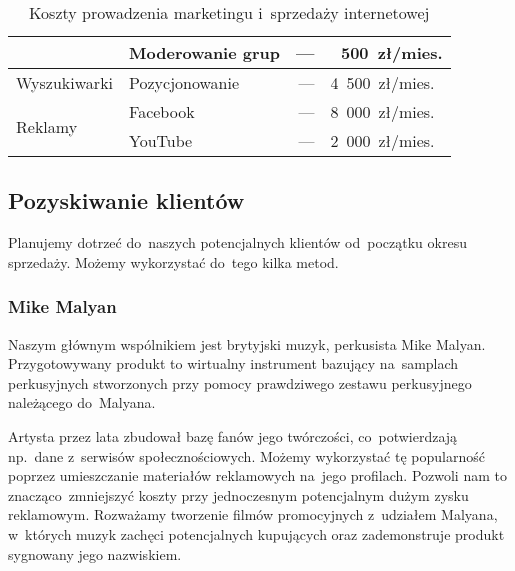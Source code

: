 \documentclass[12pt]{article}
\begin{document}
\begin{table}[h!]
\begin{center}
{\begin{tabular}{llrr}
     & Moderowanie grup   & ---    & 500~zł/mies.   \\
 \midrule
     \multirow{1}{*}{Wyszukiwarki}
     & Pozycjonowanie & --- & 4~500~zł/mies.~\cite{pozycjonowanie} \\
 \midrule
     \multirow{2}{*}{Reklamy}
     & Facebook   & --- & 8~000~zł/mies.~\cite{facebook} \\
     & YouTube    & --- & 2~000~zł/mies.~\cite{youtube}  \\
 \bottomrule
 \end{tabular}}
 \caption{Koszty prowadzenia marketingu i~sprzedaży internetowej}
 \label{table:marketing-sprzedaz}
 \end{center}
\end{table}

\subsection{Pozyskiwanie klientów}


Planujemy dotrzeć do~naszych potencjalnych klientów od~początku okresu sprzedaży.
Możemy wykorzystać do~tego kilka metod.

\subsubsection{Mike Malyan}


Naszym głównym wspólnikiem jest brytyjski muzyk, perkusista Mike Malyan.
Przygotowywany produkt to wirtualny instrument bazujący na~samplach perkusyjnych stworzonych przy pomocy prawdziwego zestawu perkusyjnego należącego do~Malyana.

Artysta przez lata zbudował bazę fanów jego twórczości, co~potwierdzają np.~dane z~serwisów społecznościowych.
Możemy wykorzystać tę popularność poprzez umieszczanie materiałów reklamowych na~jego profilach.
Pozwoli nam to znacząco~zmniejszyć koszty przy jednoczesnym potencjalnym dużym zysku reklamowym.
Rozważamy tworzenie filmów promocyjnych z~udziałem Malyana, w~których muzyk zachęci potencjalnych kupujących oraz zademonstruje produkt sygnowany jego nazwiskiem.
\end{document}
